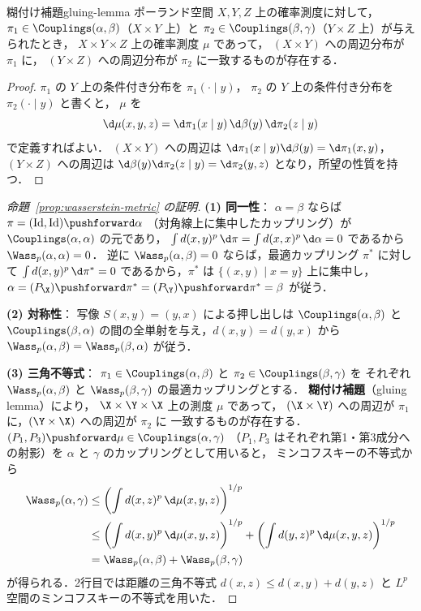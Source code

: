 \begin{proposition}{糊付け補題}{gluing-lemma}
  ポーランド空間 $X, Y, Z$ 上の確率測度に対して，
  $\pi_1 \in \Couplings(\alpha, \beta)$（$X \times Y$ 上）と
  $\pi_2 \in \Couplings(\beta, \gamma)$（$Y \times Z$ 上）が与えられたとき，
  $X \times Y \times Z$ 上の確率測度 $\mu$ であって，
  $(X \times Y)$ への周辺分布が $\pi_1$ に，
  $(Y \times Z)$ への周辺分布が $\pi_2$ に一致するものが存在する．
\end{proposition}

\begin{proof}
  $\pi_1$ の $Y$ 上の条件付き分布を $\pi_1(\cdot \mid y)$，
  $\pi_2$ の $Y$ 上の条件付き分布を $\pi_2(\cdot \mid y)$ と書くと，
  $\mu$ を
  \[
    \d\mu(x, y, z) = \d\pi_1(x \mid y) \, \d\beta(y) \, \d\pi_2(z \mid y)
  \]
  で定義すればよい．
  $(X \times Y)$ への周辺は $\d\pi_1(x \mid y) \d\beta(y) = \d\pi_1(x, y)$，
  $(Y \times Z)$ への周辺は $\d\beta(y) \d\pi_2(z \mid y) = \d\pi_2(y, z)$
  となり，所望の性質を持つ．
\end{proof}

\begin{proof}[命題~\ref{prop:wasserstein-metric} の証明]
  \textbf{(1) 同一性}：
  $\alpha = \beta$ ならば $\pi = (\operatorname{Id}, \operatorname{Id})\pushforward \alpha$
  （対角線上に集中したカップリング）が $\Couplings(\alpha, \alpha)$ の元であり，
  $\int d(x,y)^p \, \d\pi = \int d(x,x)^p \, \d\alpha = 0$ であるから $\Wass_p(\alpha, \alpha) = 0$．
  逆に $\Wass_p(\alpha, \beta) = 0$ ならば，最適カップリング $\pi^*$ に対して
  $\int d(x,y)^p \, \d\pi^* = 0$ であるから，$\pi^*$ は $\{(x,y) \mid x = y\}$ 上に集中し，
  $\alpha = (P_\X)\pushforward \pi^* = (P_\Y)\pushforward \pi^* = \beta$ が従う．

  \textbf{(2) 対称性}：
  写像 $S(x, y) = (y, x)$ による押し出しは $\Couplings(\alpha, \beta)$ と $\Couplings(\beta, \alpha)$
  の間の全単射を与え，$d(x,y) = d(y,x)$ から $\Wass_p(\alpha, \beta) = \Wass_p(\beta, \alpha)$ が従う．

  \textbf{(3) 三角不等式}：
  $\pi_1 \in \Couplings(\alpha, \beta)$ と $\pi_2 \in \Couplings(\beta, \gamma)$ を
  それぞれ $\Wass_p(\alpha, \beta)$ と $\Wass_p(\beta, \gamma)$ の最適カップリングとする．
  \textbf{糊付け補題}（gluing lemma）により，
  $\X \times \Y \times \X$ 上の測度 $\mu$ であって，
  $(\X \times \Y)$ への周辺が $\pi_1$ に，$(\Y \times \X)$ への周辺が $\pi_2$ に
  一致するものが存在する．
  $(P_1, P_3)\pushforward \mu \in \Couplings(\alpha, \gamma)$
  （$P_1, P_3$ はそれぞれ第1・第3成分への射影）を
  $\alpha$ と $\gamma$ のカップリングとして用いると，
  ミンコフスキーの不等式から
  \begin{align*}
    \Wass_p(\alpha, \gamma)
    &\leq \left( \int d(x, z)^p \, \d\mu(x, y, z) \right)^{1/p} \\
    &\leq \left( \int d(x, y)^p \, \d\mu(x, y, z) \right)^{1/p}
    + \left( \int d(y, z)^p \, \d\mu(x, y, z) \right)^{1/p} \\
    &= \Wass_p(\alpha, \beta) + \Wass_p(\beta, \gamma)
  \end{align*}
  が得られる．2行目では距離の三角不等式 $d(x,z) \leq d(x,y) + d(y,z)$ と
  $L^p$ 空間のミンコフスキーの不等式を用いた．
\end{proof}

